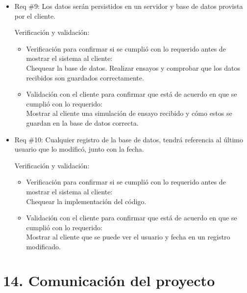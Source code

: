 \documentclass[11pt]{charter}
\begin{document}
\begin{itemize}
\item Req \#9: Los datos serán persistidos en un servidor y base de datos provista por el cliente.

Verificación y validación:

\begin{itemize}
\item Verificación para confirmar si se cumplió con lo requerido antes de mostrar el sistema al cliente:\\
Chequear la base de datos. Realizar ensayos y comprobar que los datos recibidos son guardados correctamente.
\item Validación con el cliente para confirmar que está de acuerdo en que se cumplió con lo requerido:\\
Mostrar al cliente una simulación de ensayo recibido y cómo estos se guardan en la base de datos correcta.
\end{itemize}


\item Req \#10: Cualquier registro de la base de datos, tendrá referencia al último usuario que lo modificó, junto con la fecha.

Verificación y validación:

\begin{itemize}
\item Verificación para confirmar si se cumplió con lo requerido antes de mostrar el sistema al cliente:\\
Chequear la implementación del código.
\item Validación con el cliente para confirmar que está de acuerdo en que se cumplió con lo requerido:\\
Mostrar al cliente que se puede ver el usuario y fecha en un registro modificado.
\end{itemize}

\end{itemize}

\newpage

\section{14. Comunicación del proyecto}
\label{sec:comunicaciones}

\end{document}
